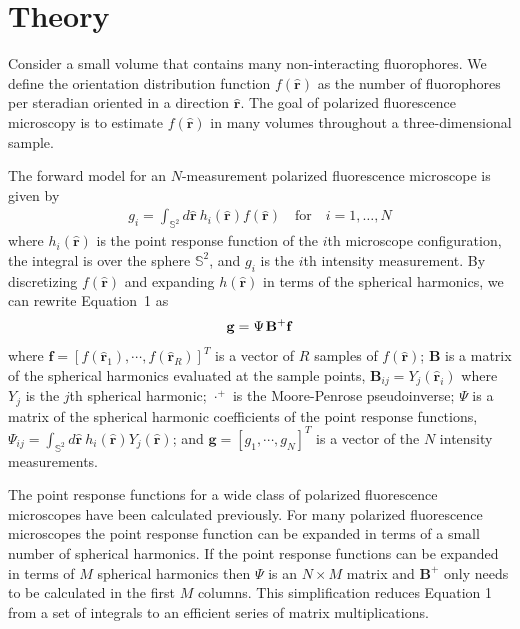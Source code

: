\documentclass[letterpaper,10pt]{article}
\begin{document}
\section{Theory}
Consider a small volume that contains many non-interacting fluorophores. We
define the orientation distribution function $f(\hat{\mathbf{r}})$ as the number
of fluorophores per steradian oriented in a direction $\hat{\mathbf{r}}$. The
goal of polarized fluorescence microscopy is to estimate $f(\hat{\mathbf{r}})$
in many volumes throughout a three-dimensional sample.

The forward model for an $N$-measurement polarized fluorescence microscope is
given by
\begin{align}
  g_i = \int_{\mathbb{S}^2}d\hat{\textbf{r}}\ h_i(\hat{\textbf{r}})f(\hat{\textbf{r}})\hspace{1em}\text{for}\hspace{1em} i=1,\dotsc,N
\end{align}
where $h_i(\hat{\textbf{r}})$ is the point response function of the $i$th
microscope configuration, the integral is over the sphere $\mathbb{S}^2$, and
$g_i$ is the $i$th intensity measurement. By discretizing $f(\hat{\mathbf{r}})$
and expanding $h(\hat{\mathbf{r}})$ in terms of the spherical harmonics, we can
rewrite Equation~1 as
\begin{align}
  \mathbf{g} = \Psi\hspace{0.1em}\mathbf{B}^+\mathbf{f}
\end{align}
where $\mathbf{f} = [f(\hat{\mathbf{r}}_1), \cdots, f(\hat{\mathbf{r}}_R)]^T$ is
a vector of $R$ samples of $f(\hat{\mathbf{r}})$; $\mathbf{B}$ is a matrix of
the spherical harmonics evaluated at the sample points,
$\mathbf{B}_{ij} = Y_j(\hat{\mathbf{r}}_i)$ where $Y_j$ is the $j$th spherical
harmonic; $\cdot^+$ is the Moore-Penrose pseudoinverse; $\Psi$ is a matrix of
the spherical harmonic coefficients of the point response functions,
$\Psi_{ij} = \int_{\mathbb{S}^2}d\hat{\textbf{r}}\
h_i(\hat{\mathbf{r}})Y_j(\hat{\mathbf{r}})$; and
$\mathbf{g} = [g_1, \cdots, g_N]^T$ is a vector of the $N$ intensity
measurements.

The point response functions for a wide class of polarized fluorescence
microscopes have been calculated previously\cite{chandler}. For many polarized
fluorescence microscopes the point response function can be expanded in terms of
a small number of spherical harmonics. If the point response functions can be
expanded in terms of $M$ spherical harmonics then $\Psi$ is an $N\times M$
matrix and $\mathbf{B}^+$ only needs to be calculated in the first $M$
columns. This simplification reduces Equation 1 from a set of integrals to an
efficient series of matrix multiplications.
\end{document}
